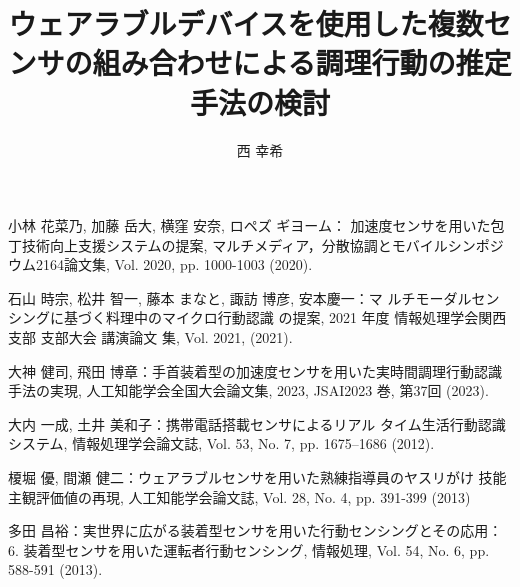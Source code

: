\documentclass[a4j,8pt,twocolumn]{extarticle}
\title{ウェアラブルデバイスを使用した複数センサの組み合わせによる調理行動の推定手法の検討}
\author{西 幸希}
\affiliation{愛知工業大学情報学部}
\begin{document}
	
\maketitle
\thispagestyle{empty}	%






\begin{thebibliography}{9}
小林 花菜乃, 加藤 岳大, 横窪 安奈, ロペズ ギヨーム：
加速度センサを用いた包丁技術向上支援システムの提案, マルチメディア，分散協調とモバイルシンポジウム2164論文集, Vol. 2020, pp. 1000-1003 (2020).

石山 時宗, 松井 智一, 藤本 まなと, 諏訪 博彦, 安本慶一：マ
ルチモーダルセンシングに基づく料理中のマイクロ行動認識
の提案, 2021 年度 情報処理学会関西支部 支部大会 講演論文
集, Vol. 2021, (2021).

大神 健司, 飛田 博章：手首装着型の加速度センサを用いた実時間調理行動認識手法の実現,
 人工知能学会全国大会論文集, 2023, JSAI2023 巻, 第37回 (2023).

大内 一成, 土井 美和子：携帯電話搭載センサによるリアル
タイム生活行動認識システム, 情報処理学会論文誌, Vol. 53,
No. 7, pp. 1675–1686 (2012).

榎堀 優, 間瀬 健二：ウェアラブルセンサを用いた熟練指導員のヤスリがけ
技能主観評価値の再現, 人工知能学会論文誌, Vol. 28, No. 4, pp. 391-399 (2013)

多田 昌裕：実世界に広がる装着型センサを用いた行動センシングとその応用：6. 装着型センサを用いた運転者行動センシング, 情報処理, Vol. 54, No. 6, pp. 588-591 (2013).
\end{thebibliography}


\end{document}
